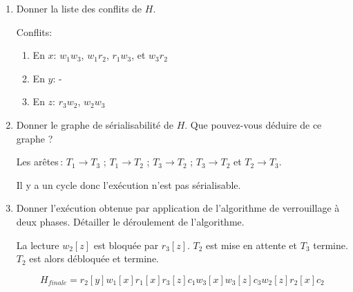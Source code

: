 \begin{enumerate}
 \item Donner la liste des conflits de $H$. 

\begin{solution}

Conflits:
\begin{enumerate}
 \item En $x$: $w_1w_3$, $w_1r_2$, $r_1w_3$, et $w_3r_2$
  \item En $y$: -
  \item En $z$: $r_3w_2$, $w_2w_3$
\end{enumerate}

\end{solution}

 \item Donner le graphe de sérialisabilité de $H$. Que pouvez-vous déduire de ce graphe ? 

\begin{solution}
Les arêtes\,: $T_1 \to T_3$ ; $T_1 \to T_2$ ; $T_3 \to T_2$ ; $T_3 \to T_2$  et  $T_2 \to T_3$.

Il y a un cycle donc l'exécution n'est pas sérialisable.
\end{solution}

\item  Donner l'exécution obtenue 
par application de l'algorithme de verrouillage à deux phases. 
Détailler le déroulement de l'algorithme. 


\begin{solution}
La lecture $w_2[z]$ est bloquée par $r_3[z]$. $T_2$ est mise en attente et $T_3$ termine. $T_2$
est alors débloquée et termine.

$$H_{finale} = r_2[y] w_1[x] r_1[x] r_3[z] c_1 w_3[x] w_3[z] c_3 w_2[z] r_2[x] c_2$$
\end{solution}
\end{enumerate}



